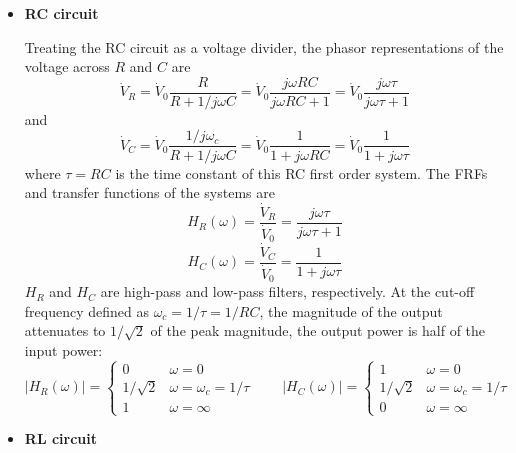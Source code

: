 \documentclass{article}
\begin{document}
\begin{itemize}
\item {\bf RC circuit} 

  Treating the RC circuit as a voltage divider, the phasor representations of
  the voltage across $R$ and $C$ are
  \begin{equation}
    \dot{V}_R=\dot{V}_0\frac{R}{R+1/j\omega C}=\dot{V}_0\frac{j\omega RC}{j\omega RC+1}
    =\dot{V}_0\frac{j\omega\tau}{j\omega\tau+1}
  \end{equation}
  and
  \begin{equation}
    \dot{V}_C=\dot{V}_0\frac{1/j\omega_c}{R+1/j\omega C}
    =\dot{V}_0\frac{1}{1+j\omega RC}=\dot{V}_0\frac{1}{1+j\omega\tau}
  \end{equation}
  where $\tau=RC$ is the time constant of this RC first order system. The 
  FRFs and transfer functions of the systems are
  \begin{equation} 
    H_R(\omega)=\frac{\dot{V}_R}{\dot{V}_0}=\frac{j\omega\tau}{j\omega\tau+1}
  \end{equation}
  \begin{equation} 
    H_C(\omega)=\frac{\dot{V}_C}{\dot{V}_0}=\frac{1}{1+j\omega\tau}
  \end{equation}
  $H_R$ and $H_C$ are high-pass and low-pass filters, respectively. At the 
  cut-off frequency defined as $\omega_c=1/\tau=1/RC$, the magnitude of the 
  output attenuates to $1/\sqrt{2}$ of the peak magnitude, the output power 
  is half of the input power:
  \begin{equation}
    |H_R(\omega)|=\left\{\begin{array}{cl}0&\omega=0\\
    1/\sqrt{2}&\omega=\omega_c=1/\tau\\1&\omega=\infty\end{array}\right.
    \;\;\;\;\;\;\;
    |H_C(\omega)|=\left\{\begin{array}{cl}1&\omega=0\\
    1/\sqrt{2}&\omega=\omega_c=1/\tau\\0&\omega=\infty\end{array}\right.
  \end{equation}

\item {\bf RL circuit}


\end{itemize}
\end{document}
